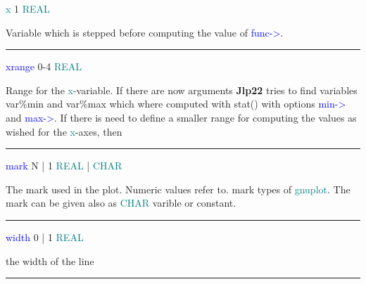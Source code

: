 \noindent \textcolor{teal}{x} \tabto{3cm} 1 \tabto{5cm}  \textcolor{teal}{REAL} \tabto{7cm} 
\begin{changemargin}{3cm}{0cm} 
\noindent Variable which is stepped before computing the value of \textcolor{blue}{func->}. 
\end{changemargin} 
\vspace{0.3cm} 
\hrule 
\vspace{0.3cm} 
\noindent \textcolor{blue}{xrange} \tabto{3cm} 0-4 \tabto{5cm}  \textcolor{teal}{REAL} \tabto{7cm} 
\begin{changemargin}{3cm}{0cm} 
\noindent  Range for the \textcolor{teal}{x}-variable. If there are now arguments \textbf{Jlp22} tries to 
find variables var\%min and var\%max which where computed with \textcolor{VioletRed}{stat}() with options \textcolor{blue}{min->} 
and \textcolor{blue}{max->}. If there is need to define a smaller range for computing the values as wished 
for the \textcolor{teal}{x}-axes, then 
\end{changemargin} 
\vspace{0.3cm} 
\hrule 
\vspace{0.3cm} 
\noindent \textcolor{blue}{mark}  \tabto{3cm}  N | 1  \tabto{5cm}   \textcolor{teal}{REAL} | \textcolor{teal}{CHAR}  \tabto{7cm} 
\begin{changemargin}{3cm}{0cm} 
\noindent  The mark used in the plot. 
Numeric values refer to. 
mark types of \textcolor{teal}{gnuplot}. The mark can be given also as \textcolor{teal}{CHAR} varible or constant. 
\end{changemargin} 
\vspace{0.3cm} 
\hrule 
\vspace{0.3cm} 
\noindent \textcolor{blue}{width}  \tabto{3cm}  0 | 1  \tabto{5cm}   \textcolor{teal}{REAL}  \tabto{7cm} 
\begin{changemargin}{3cm}{0cm} 
\noindent  the width of the line 
\end {changemargin} 
\hrule 
\vspace{0.2cm} 
\singlespacing 
